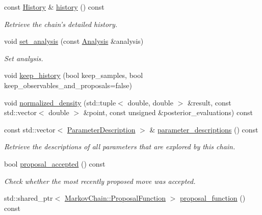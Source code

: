 \begin{DoxyCompactItemize}
const \hyperlink{structeos_1_1MarkovChain_1_1History}{History} \& \hyperlink{classeos_1_1MarkovChain_ae1ef51057e7a205fbc9d04a5e913fb06}{history} () const 
\begin{DoxyCompactList}\small\item\em Retrieve the chain's detailed history. \item\end{DoxyCompactList}\item 
void \hyperlink{classeos_1_1MarkovChain_a808902afe1f1c7def764c4c492e29f1d}{set\_\-analysis} (const \hyperlink{classeos_1_1Analysis}{Analysis} \&analysis)
\begin{DoxyCompactList}\small\item\em Set analysis. \item\end{DoxyCompactList}\item 
void \hyperlink{classeos_1_1MarkovChain_a8aa1b0fac7040d32e42a8b2a8a508743}{keep\_\-history} (bool keep\_\-samples, bool keep\_\-observables\_\-and\_\-proposals=false)
\item 
void \hyperlink{classeos_1_1MarkovChain_a0424b9803e0a479c88f76713455662fa}{normalized\_\-density} (std::tuple$<$ double, double $>$ \&result, const std::vector$<$ double $>$ \&point, const unsigned \&posterior\_\-evaluations) const 
\item 
const std::vector$<$ \hyperlink{structeos_1_1ParameterDescription}{ParameterDescription} $>$ \& \hyperlink{classeos_1_1MarkovChain_affcf4c3c4284fd0fae634c5cf1a97fa2}{parameter\_\-descriptions} () const 
\begin{DoxyCompactList}\small\item\em Retrieve the descriptions of all parameters that are explored by this chain. \item\end{DoxyCompactList}\item 
bool \hyperlink{classeos_1_1MarkovChain_a42c06afd1034be43e44bcbb24a15c808}{proposal\_\-accepted} () const 
\begin{DoxyCompactList}\small\item\em Check whether the most recently proposed move was accepted. \item\end{DoxyCompactList}\item 
std::shared\_\-ptr$<$ \hyperlink{structeos_1_1MarkovChain_1_1ProposalFunction}{MarkovChain::ProposalFunction} $>$ \hyperlink{classeos_1_1MarkovChain_acfde2f6063a9ad8f6a4dabb548997b4d}{proposal\_\-function} () const 

\end{DoxyCompactItemize}
